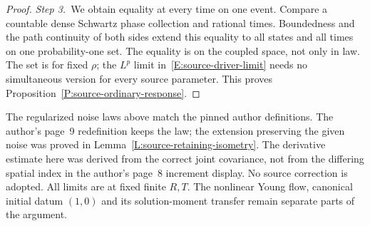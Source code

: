 \begin{proof}
  \medskip
  \noindent\textit{Step 3.~}We obtain equality at every time on one event.
  Compare a countable dense Schwartz phase collection and rational times.
  Boundedness and the path continuity of both sides extend this equality to all
  states and all times on one probability-one set. The equality is on the
  coupled space, not only in law. The set is for fixed $\rho$; the $L^p$ limit
  in~\eqref{E:source-driver-limit} needs no simultaneous version for every
  source parameter. This proves Proposition~\ref{P:source-ordinary-response}.
\end{proof}

The regularized noise laws above match the pinned author definitions. The
author's page~9 redefinition keeps the law; the extension preserving the given
noise was proved in Lemma~\ref{L:source-retaining-isometry}. The derivative
estimate here was derived from the correct joint covariance, not from the
differing spatial index in the author's page~8 increment display. No source
correction is adopted. All limits are at fixed finite $R,T$. The nonlinear Young
flow, canonical initial datum $(1,0)$ and its solution-moment transfer remain
separate parts of the argument.
